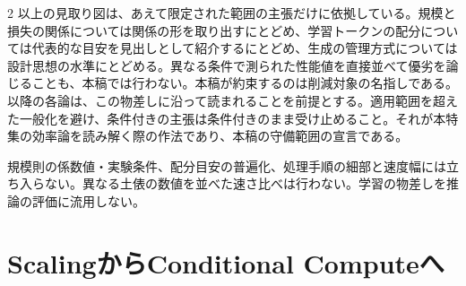 \documentclass[lualatex,a4paper,10pt]{jlreq}
\begin{document}
\begin{multicols}{2}
\raggedcolumns
以上の見取り図は、あえて限定された範囲の主張だけに依拠している。規模と損失の関係については関係の形を取り出すにとどめ、学習トークンの配分については代表的な目安を見出しとして紹介するにとどめ、生成の管理方式については設計思想の水準にとどめる。異なる条件で測られた性能値を直接並べて優劣を論じることも、本稿では行わない。本稿が約束するのは削減対象の名指しである。以降の各論は、この物差しに沿って読まれることを前提とする。適用範囲を超えた一般化を避け、条件付きの主張は条件付きのまま受け止めること。それが本特集の効率論を読み解く際の作法であり、本稿の守備範囲の宣言である。
\end{multicols}

\begin{claimboundary}[本節の読解上の境界]
規模則の係数値・実験条件、配分目安の普遍化、処理手順の細部と速度幅には立ち入らない。異なる土俵の数値を並べた速さ比べは行わない。学習の物差しを推論の評価に流用しない。
\end{claimboundary}

\section{ScalingからConditional Computeへ}
\label{sec:moe}
\end{document}
